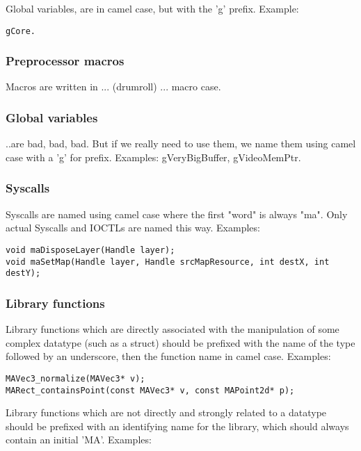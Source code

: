 \documentclass {article}
\begin{document}
Global variables, are in camel case, but with the 'g' prefix. Example:

\begin{verbatim}
gCore.
\end{verbatim}

\subsubsection{Preprocessor macros}

Macros are written in ... (drumroll) ... macro case.

\subsubsection{Global variables}

..are bad, bad, bad. But if we really need to use them, we name them using camel case with a 'g' for prefix. Examples: gVeryBigBuffer, gVideoMemPtr.

\subsubsection{Syscalls}

Syscalls are named using camel case where the first "word" is always "ma". Only actual Syscalls and IOCTLs are named this way. Examples:

\begin{verbatim}
void maDisposeLayer(Handle layer);
void maSetMap(Handle layer, Handle srcMapResource, int destX, int destY);
\end{verbatim}

\subsubsection{Library functions}

Library functions which are directly associated with the manipulation of some complex datatype (such as a struct) should be prefixed with the name of the type followed by an underscore, then the function name in camel case. Examples: 

\begin{verbatim} 
MAVec3_normalize(MAVec3* v);
MARect_containsPoint(const MAVec3* v, const MAPoint2d* p);
\end{verbatim}

Library functions which are not directly and strongly related to a datatype should be prefixed with an identifying name for the library, which should always contain an initial 'MA'. Examples: 
\end{document}
